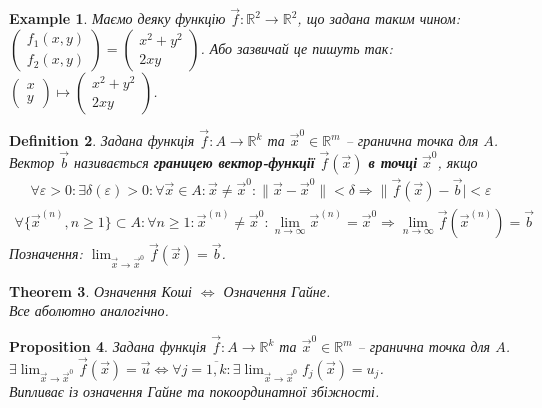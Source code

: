 \documentclass[a4paper, 10pt]{article}
\def\huge{\displaystyle}
\theoremstyle{theoremdd}
\newtheorem{theorem}{Theorem}[subsection]
\theoremstyle{theoremdd}
\theoremstyle{theoremdd}
\newtheorem{definition}[theorem]{Definition}
\theoremstyle{theoremdd}
\theoremstyle{theoremdd}
\newtheorem{example}[theorem]{Example}
\theoremstyle{theoremdd}
\newtheorem{proposition}[theorem]{Proposition}
\theoremstyle{theoremdd}
\theoremstyle{theoremdd}
\theoremstyle{theoremdd}
\begin{document}
\begin{example}
Маємо деяку функцію $\vec{f} \colon \mathbb{R}^2 \to \mathbb{R}^2$, що задана таким чином:\\
$\begin{pmatrix}
f_1(x,y) \\
f_2(x,y)
\end{pmatrix} = \begin{pmatrix}
x^2 + y^2 \\ 2xy
\end{pmatrix}$. Або зазвичай це пишуть так: $\begin{pmatrix}
x \\ y
\end{pmatrix} \mapsto \begin{pmatrix}
x^2+y^2 \\ 2xy
\end{pmatrix}$.
\end{example}

\begin{definition}
Задана функція $\vec{f} \colon A \to \mathbb{R}^k$ та $\vec{x}^0 \in \mathbb{R}^m$ -- гранична точка для $A$.\\
Вектор $\vec{b}$ називається \textbf{границею вектор-функції} $\vec{f}(\vec{x})$ \textbf{в точці} $\vec{x}^0$, якщо
	\begin{align*}
	\forall \varepsilon > 0: \exists \delta(\varepsilon) > 0: \forall \vec{x} \in A: \vec{x} \neq \vec{x}^0: \|\vec{x}-\vec{x}^0\|<\delta \Rightarrow \|\vec{f}(\vec{x})-\vec{b}|<\varepsilon \tag*{означення Коші}
	\end{align*}
	\begin{align*}
	\forall \{\vec{x}^{(n)}, n \geq 1\} \subset A: \forall n \geq 1: \vec{x}^{(n)} \neq \vec{x}^0: \lim_{n \to \infty} \vec{x}^{(n)} = \vec{x}^0 \Rightarrow \lim_{n \to \infty} \vec{f}(\vec{x}^{(n)}) = \vec{b} \tag*{означення Гайне}
	\end{align*}
Позначення: $\huge \lim_{\vec{x} \to \vec{x}^0} \vec{f}(\vec{x}) = \vec{b}$.
\end{definition}

\begin{theorem}
Означення Коші $\iff$ Означення Гайне.\\
\textit{Все аболютно аналогічно.}
\end{theorem}

\begin{proposition}
Задана функція $\vec{f} \colon A \to \mathbb{R}^k$ та $\vec{x}^0 \in \mathbb{R}^m$ -- гранична точка для $A$.\\
$\exists \huge\lim_{\vec{x} \to \vec{x}^0} \vec{f}(\vec{x}) = \vec{u} \iff \forall j = \overline{1,k}: \exists \lim_{\vec{x} \to \vec{x}^0} f_j(\vec{x}) = u_j$.\\
\textit{Випливає із означення Гайне та покоординатної збіжності.}
\end{proposition}
\end{document}
